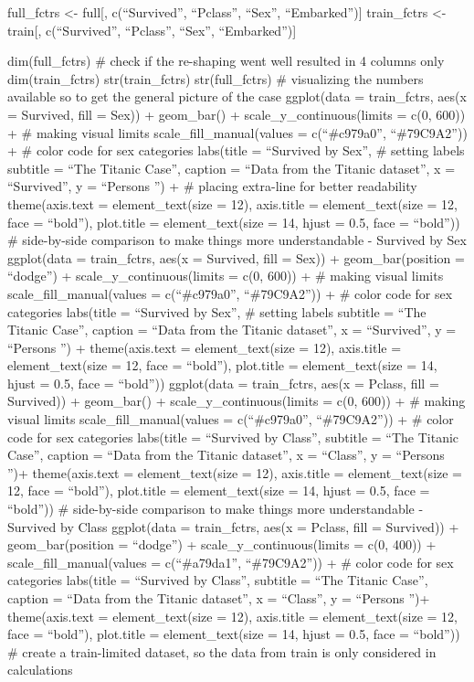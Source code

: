 \documentclass[
]{article}
\begin{document}
full\_fctrs \textless- full{[}, c(``Survived'', ``Pclass'', ``Sex'',
``Embarked''){]} train\_fctrs \textless- train{[}, c(``Survived'',
``Pclass'', ``Sex'', ``Embarked''){]}

dim(full\_fctrs) \# check if the re-shaping went well resulted in 4
columns only dim(train\_fctrs) str(train\_fctrs) str(full\_fctrs) \#
visualizing the numbers available so to get the general picture of the
case ggplot(data = train\_fctrs, aes(x = Survived, fill = Sex)) +
geom\_bar() + scale\_y\_continuous(limits = c(0, 600)) + \# making
visual limits scale\_fill\_manual(values = c(``\#c979a0'',
``\#79C9A2'')) + \# color code for sex categories labs(title =
``Survived by Sex'', \# setting labels subtitle = ``The Titanic Case'',
caption = ``Data from the Titanic dataset'', x = ``\n Survived'', y =
``Persons \n'') + \# placing extra-line for better readability
theme(axis.text = element\_text(size = 12), axis.title =
element\_text(size = 12, face = ``bold''), plot.title =
element\_text(size = 14, hjust = 0.5, face = ``bold'')) \# side-by-side
comparison to make things more understandable - Survived by Sex
ggplot(data = train\_fctrs, aes(x = Survived, fill = Sex)) +
geom\_bar(position = ``dodge'') + scale\_y\_continuous(limits = c(0,
600)) + \# making visual limits scale\_fill\_manual(values =
c(``\#c979a0'', ``\#79C9A2'')) + \# color code for sex categories
labs(title = ``Survived by Sex'', \# setting labels subtitle = ``The
Titanic Case'', caption = ``Data from the Titanic dataset'', x =
``\n Survived'', y = ``Persons \n'') + theme(axis.text =
element\_text(size = 12), axis.title = element\_text(size = 12, face =
``bold''), plot.title = element\_text(size = 14, hjust = 0.5, face =
``bold'')) ggplot(data = train\_fctrs, aes(x = Pclass, fill = Survived))
+ geom\_bar() + scale\_y\_continuous(limits = c(0, 600)) + \# making
visual limits scale\_fill\_manual(values = c(``\#c979a0'',
``\#79C9A2'')) + \# color code for sex categories labs(title =
``Survived by Class'', subtitle = ``The Titanic Case'', caption = ``Data
from the Titanic dataset'', x = ``\n Class'', y = ``Persons \n'')+
theme(axis.text = element\_text(size = 12), axis.title =
element\_text(size = 12, face = ``bold''), plot.title =
element\_text(size = 14, hjust = 0.5, face = ``bold'')) \# side-by-side
comparison to make things more understandable - Survived by Class
ggplot(data = train\_fctrs, aes(x = Pclass, fill = Survived)) +
geom\_bar(position = ``dodge'') + scale\_y\_continuous(limits = c(0,
400)) + scale\_fill\_manual(values = c(``\#a79da1'', ``\#79C9A2'')) + \#
color code for sex categories labs(title = ``Survived by Class'',
subtitle = ``The Titanic Case'', caption = ``Data from the Titanic
dataset'', x = ``\n Class'', y = ``Persons \n'')+ theme(axis.text =
element\_text(size = 12), axis.title = element\_text(size = 12, face =
``bold''), plot.title = element\_text(size = 14, hjust = 0.5, face =
``bold'')) \# create a train-limited dataset, so the data from train is
only considered in calculations
\end{document}
